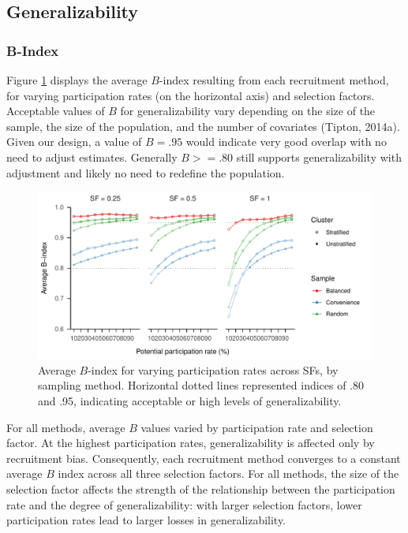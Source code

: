 \documentclass[
  man,floatsintext]{apa6}
\begin{document}
\hypertarget{generalizability-1}{%
\subsection*{Generalizability}\label{generalizability-1}}

\hypertarget{b-index}{%
\subsubsection*{B-Index}\label{b-index}}

Figure \ref{fig:fig-avg-B} displays the average \(B\)-index resulting from each recruitment method, for varying participation rates (on the horizontal axis) and selection factors. Acceptable values of \(B\) for generalizability vary depending on the size of the sample, the size of the population, and the number of covariates (Tipton, 2014a). Given our design, a value of \(B = .95\) would indicate very good overlap with no need to adjust estimates. Generally \(B >= .80\) still supports generalizability with adjustment and likely no need to redefine the population.



\begin{figure}
\centering
\includegraphics{6---Paper_files/figure-latex/fig-avg-B-1.pdf}
\caption{\label{fig:fig-avg-B}Average \(B\)-index for varying participation rates across SFs, by sampling method. Horizontal dotted lines represented indices of .80 and .95, indicating acceptable or high levels of generalizability.}
\end{figure}

For all methods, average \(B\) values varied by participation rate and selection factor. At the highest participation rates, generalizability is affected only by recruitment bias. Consequently, each recruitment method converges to a constant average \(B\) index across all three selection factors. For all methods, the size of the selection factor affects the strength of the relationship between the participation rate and the degree of generalizability: with larger selection factors, lower participation rates lead to larger losses in generalizability.
\end{document}
